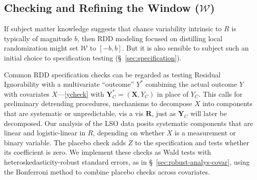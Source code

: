 \subsection{Checking and Refining the Window ($\mathcal{W}$)}
\label{sec:bandwidthChoice}

If subject matter knowledge suggests that chance variability intrinsic
to $R$ is typically of magnitude $b$, then RDD modeling focused on
distilling local randomization might set $\mathcal{W}$ to $[-b,b]$. But it
is also sensible to subject such an initial choice to specification
testing (\S~\ref{sec:specification}).%

Common RDD specification checks
can be regarded as testing Residual Ignorability with a multivariate
``outcome'' $Y^{*}$ combining the actual outcome $Y$ with covariates $X$---\eqref{ycheck} with
$\mathbf{Y}_{C}^{*} = (\mathbf{X}, {Y}_C)$ in place of $Y_{C}$.
%
This calls for preliminary detrending procedures, mechanisms to
decompose  $X$ into components that are systematic or unpredictable,
vis a vis $\mathbf{R}$, just as ${\mathbf{Y}_C}$ will later be decomposed.
Our analysis of the LSO data posits systematic components that are
linear and logistic-linear in $R$, depending on whether $X$ is
a measurement or binary variable. %
The placebo check adds $Z$ to the specification and tests whether its
coefficient is zero.  We implement these checks as Wald tests with
heteroskedasticity-robust standard errors, as in
\S~\ref{sec:robust-analys-covar}, using the Bonferroni method to
combine placebo checks across covariates.

